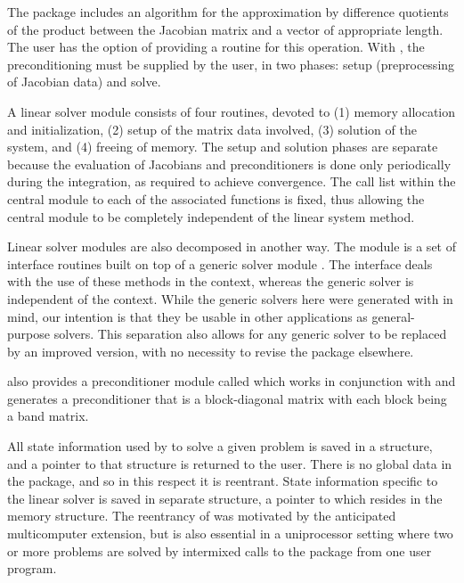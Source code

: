 The {\kinspgmr} package includes an algorithm for the approximation
by difference quotients of the product between the Jacobian matrix and
a vector of appropriate length. The user has the option of providing
a routine for this operation.
With  {\kinspgmr}, 
the preconditioning must be supplied by the user, in two phases: 
setup (preprocessing of Jacobian data) and solve.

A {\kinsol} linear solver module consists of four routines, devoted to (1)
memory allocation and initialization, (2) setup of the matrix data
involved, (3) solution of the system, and (4) freeing of memory.  
The setup and solution phases are separate because the evaluation of
Jacobians and preconditioners is done only periodically during the
integration, as required to achieve convergence. The call list within
the central {\kinsol} module to each of the associated functions is
fixed, thus allowing the central module to be completely independent
of the linear system method.

Linear solver modules are also decomposed in another way.
The module {\kinspgmr} is a set of 
interface routines built on top of a generic solver module {\spgmr}.  
The interface deals with the use of these methods in the {\kinsol} context, 
whereas the generic solver is independent of the context.
While the generic solvers here were generated with {\sundials} in mind, our
intention is that they be usable in other applications as
general-purpose solvers.  This separation also allows for any generic
solver to be replaced by an improved version, with no necessity to
revise the {\kinsol} package elsewhere.

{\kinsol} also provides a preconditioner module called {\kinbbdpre} which
works in conjunction with {\nvecp} and generates a preconditioner that is
a block-diagonal matrix with each block being a band matrix.

All state information used by {\kinsol} to solve a given problem is saved
in a structure, and a pointer to that structure is returned to the
user.  There is no global data in the {\kinsol} package, and so in this
respect it is reentrant. State information specific to the linear
solver is saved in separate structure, a pointer to which resides in
the {\kinsol} memory structure. The reentrancy of {\kinsol} was motivated
by the anticipated multicomputer extension, but is also essential
in a uniprocessor setting where two or more problems are solved by
intermixed calls to the package from one user program.
